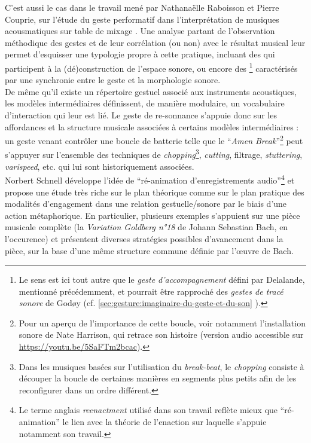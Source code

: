 \indent C'est aussi le cas dans le travail mené par Nathanaëlle Raboisson et Pierre Couprie, sur l'étude du geste performatif dans l'interprétation de musiques acousmatiques sur table de mixage \cite{raboisson_experience_2017}. Une analyse partant de l'observation méthodique des gestes et de leur corrélation (ou non) avec le résultat musical leur permet d'esquisser une typologie propre à cette pratique, incluant des  qui participent à la (dé)construction de l'espace sonore, ou encore des \footnote{Le sens est ici tout autre que le \textit{geste d'accompagnement} défini par Delalande, mentionné précédemment, et pourrait être rapproché des \textit{gestes de tracé sonore} de Godøy (cf. \ref{sec:gesture:imaginaire-du-geste-et-du-son}
).} caractérisés par une synchronie entre le geste et la morphologie sonore.\\
\indent De même qu'il existe un répertoire gestuel associé aux instruments acoustiques, les modèles intermédiaires définissent, de manière modulaire, un vocabulaire d'interaction qui leur est lié. Le geste de re-sonnance s'appuie donc sur les affordances et la structure musicale associées à certains modèles intermédiaires : un geste venant contrôler une boucle de batterie telle que le ``\textit{Amen Break}''\footnote{Pour un aperçu de l'importance de cette boucle, voir notamment l'installation sonore  de Nate Harrison, qui retrace son histoire (version audio accessible sur \url{https://youtu.be/5SaFTm2bcac}).} peut s'appuyer sur l'ensemble des techniques de \textit{chopping}\footnote{Dans les musiques basées sur l'utilisation du \textit{break-beat}, le \textit{chopping} consiste à découper la boucle de certaines manières en segments plus petits afin de les reconfigurer dans un ordre différent.}, \textit{cutting}, filtrage, \textit{stuttering}, \textit{varispeed}, etc. qui lui sont historiquement associées.\\
\indent Norbert Schnell développe l'idée de ``ré-animation d'enregistrements audio''\footnote{Le terme anglais \textit{reenactment} utilisé dans son travail reflète mieux que ``ré-animation'' le lien avec la théorie de l'enaction sur laquelle s'appuie notamment son travail.} \cite{schnell_playing_2013} et propose une étude très riche sur le plan théorique comme sur le plan pratique des modalités d'engagement dans une relation gestuelle/sonore par le biais d'une action métaphorique. En particulier, plusieurs exemples s'appuient sur une pièce musicale complète (la \textit{Variation Goldberg n°18} de Johann Sebastian Bach, en l'occurence) et présentent diverses stratégies possibles d'avancement dans la pièce, sur la base d'une même structure commune définie par l'œuvre de Bach.


